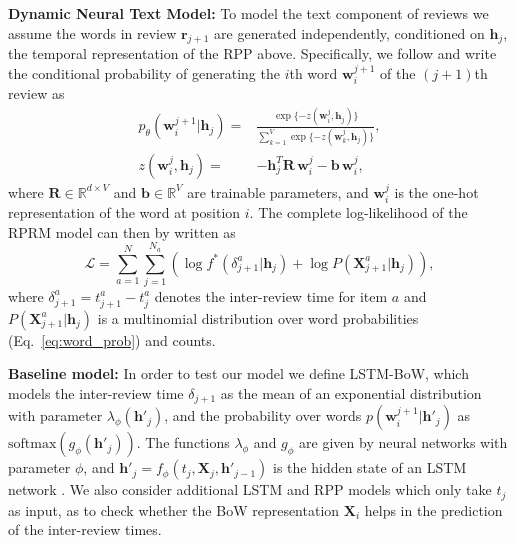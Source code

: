 \documentclass[letterpaper]{article} %
\newcommand{\+}[1]{\boldsymbol{\mathbf{#1}}}
\newcommand*{\Eqref}[1]{Eq.~\eqref{#1}}
\def\*#1{\mathbf{#1}}
\begin{document}

\textbf{Dynamic Neural Text Model:} To model the text component of reviews we assume the words in review $\*r_{j+1}$ are generated independently, conditioned on $\*h_j$, the temporal representation of the RPP above. Specifically, we follow \cite{miao2016neural} and write the conditional probability of generating the $i$th word $\*w^{j+1}_i$ of the $(j+1)$th review as
\begin{align}
    p_\theta(\*w^{j+1}_i|\*h_j) =&  \frac{\exp{\{-z(\*w^j_i,\*h_j)\}}}{\sum_{k=1}^V \exp{\{-z(\*w^j_k,\*h_j)\}}},  \label{eq:word_prob} \\ 
    z(\*w^j_i,\*h_j) =& -\*h^T_j \*R \, \*w^j_i - \*b \, \*w^j_i, 
\end{align}
where $\*R \in \mathbb{R}^{d \times V}$ and $\*b \in \mathbb{R}^V$ are trainable parameters, and $\*w^{j}_i$ is the one-hot representation of the word at position $i$. 
The complete log-likelihood of the RPRM model can then by written as
\begin{equation}
    \mathcal{L}=\sum_{a=1}^{N}\sum_{j=1}^{N_a}(\log f^*(\delta^a_{j+1}|\*h_j)+ \log P(\mathbf{X}^a_{j+1}| \*h_j)),
\end{equation}
where $\delta^a_{j+1} = t^a_{j+1}-t^a_j$ denotes the inter-review time for item $a$ and $P(\mathbf{X}^a_{j+1}| \*h_j)$ is a multinomial distribution over word probabilities (\Eqref{eq:word_prob}) and counts.

\textbf{Baseline model:} In order to test our model we define LSTM-BoW, which models the inter-review time $\delta_{j+1}$ as the mean of an exponential distribution with parameter $\lambda_{\phi}(\*h'_j)$, and the probability over words $p(\*w^{j+1}_i|\*h'_j)$ as $\mbox{softmax}(g_{\phi}(\*h'_j))$. The functions $\lambda_{\phi}$ and $g_{\phi}$ are given by neural networks with parameter $\phi$, and $\*h'_j = f_{\phi}(t_{j}, \*X_j, \*h'_{j-1})$ is the hidden state of an LSTM network \cite{LSTM}.
We also consider additional LSTM and RPP models which only take $t_j$ as input, as to check whether the BoW representation $\*X_i$ helps in the prediction of the inter-review times.
\end{document}
